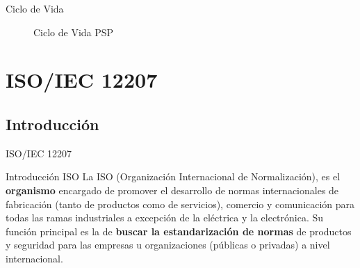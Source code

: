 \documentclass{beamer}
\begin{document}
			\begin{frame}{Ciclo de Vida}
				\begin{figure}								
					 \caption{Ciclo de Vida PSP}
				\end{figure}			
			\end{frame}
			
			
			
			
\section{ISO/IEC 12207}
		\subsection{Introducci\'on}
		
			\begin{frame}
				\begin{center}
					\begin{block}{}
						\begin{center}
							{\huge ISO/IEC 12207}
						\end{center}
					\end{block}
				\end{center}
			\end{frame}					
		
			\begin{frame}{Introducci\'on ISO}
				La ISO (Organización Internacional de Normalización), es el \textbf{organismo} encargado de promover el desarrollo de normas internacionales de fabricación (tanto de productos como de servicios), comercio y comunicación para todas las ramas industriales a excepción de la eléctrica y la electrónica. Su función principal es la de \textbf{buscar la estandarización de normas} de productos y seguridad para las empresas u organizaciones (públicas o privadas) a nivel internacional.\\ \smallskip
			\end{frame}
		
\end{document}
